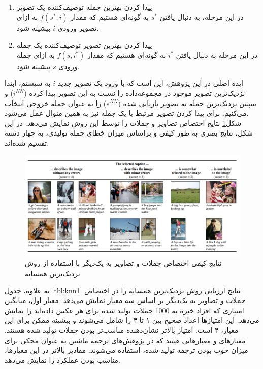 \begin{enumerate}
\item پیدا کردن بهترین جمله توصیف‌کننده یک تصویر
\\
در این مرحله، به دنبال یافتن $s^*$ به گونه‌ای هستیم که مقدار 
$f(s^*, i)$ 
به ازای تصویر ورودی $i$ بیشینه شود.
\item پیدا کردن بهترین تصویر توصیف‌کننده یک جمله
\\
در این مرحله به دنبال یافتن $i^*$ به گونه‌ای هستیم که مقدار 
$f(s,i^*)$
به ازای جمله ورودی $s$ بیشینه شود.
\end{enumerate}

ایده اصلی در این پژوهش، این است که با ورود یک تصویر جدید $i$ به سیستم، ابتدا نزدیک‌ترین تصویر موجود در مجموعه‌داده را نسبت به این تصویر پیدا کرده ($i^{NN}$) و سپس نزدیک‌ترین جمله به تصویر بازیابی شده ($s^{NN}$) را به عنوان جمله خروجی انتخاب می‌کنیم. برای پیدا کردن تصویر مرتبط با یک جمله نیز به همین منوال عمل می‌شود.
\\

شکل\ref{fig:knn1}
نتایج اختصاص تصاویر و جملات را توسط این روش نمایش می‌دهد. در این شکل، نتایج بصری به طور کیفی و براساس میزان خطای جمله تولیدی، به چهار دسته تقسیم شده‌اند. 


\begin{figure}[h]
\center
\includegraphics[scale=0.55]{Imgs/sentence_knn1.png}
\caption{نتایج کیفی اختصاص جملات و تصاویر به یک‌دیگر با استفاده از روش نزدیک‌ترین همسایه \cite{hodosh2013framing}}
\label{fig:knn1}
\end{figure}

به علاوه، جدول 
\ref{tbl:knn1}
نتایج ارزیابی روش نزدیک‌ترین همسایه را در اختصاص جملات و تصاویر به یک‌دیگر بر اساس سه معیار نمایش می‌دهد. معیار اول، میانگین امتیازی که افراد خبره به 1000 جملات تولید شده برای هر عکس داده‌اند را نمایش می‌دهد. این امتیازها اعداد صحیح بین ۱ تا ۴ را شامل می‌شوند و بیشینه ممکن برای این معیار، ۴ است. امتیاز بالاتر نشان‌دهنده مناسب‌تر بودن جملات تولید شده هستند. معیارهای  و  معیارهایی هیتند که در پژوهش‌های ترجمه ماشین به عنوان محکی برای میزان خوب بودن ترجمه تولید شده، استفاده می‌شوند. مقادیر بالاتر در این معیارها، مناسب بودن عملکرد را نمایش می‌دهد. 

